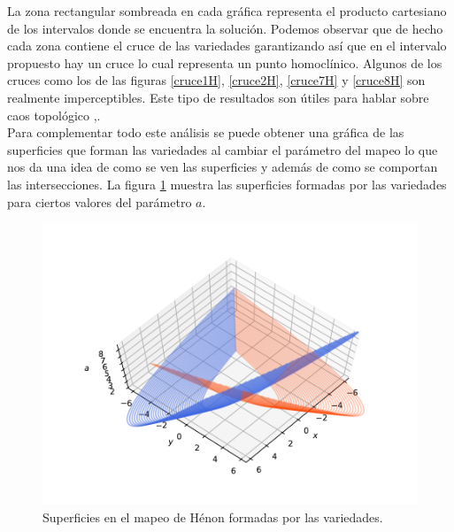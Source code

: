 La zona rectangular sombreada en cada gráfica representa el producto cartesiano de los intervalos donde se encuentra la solución. Podemos observar que de hecho cada zona contiene el cruce de las variedades garantizando así que en el intervalo propuesto hay un cruce lo cual representa un punto homoclínico. Algunos de los cruces como los de las figuras \ref{cruce1H}, \ref{cruce2H}, \ref{cruce7H} y \ref{cruce8H} son realmente imperceptibles. Este tipo de resultados son útiles para hablar sobre caos topológico \cite{devaney},\cite{gerald}.\\

Para complementar todo este análisis se puede obtener una gráfica de las superficies que forman las variedades al cambiar el parámetro del mapeo lo que nos da una idea de como se ven las superficies y además de como se comportan las intersecciones. La figura \ref{SuperficiesH} muestra las superficies formadas por las variedades para ciertos valores del parámetro $a$.
\begin{figure}[H]
\centering
\includegraphics[scale=0.9]{HenonV}
\caption{Superficies en el mapeo de Hénon formadas por las variedades.}
\label{SuperficiesH}
\end{figure}



